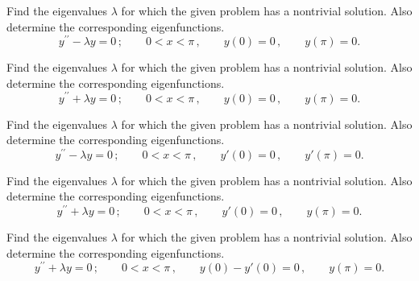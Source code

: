 \documentclass[11pt]{article}
\begin{document}
\makelabtitle





\begin{problem}
Find the eigenvalues $\lambda$ for which the given problem has a nontrivial solution. Also determine the corresponding eigenfunctions.
\begin{equation*}
y^{\prime \prime} - \lambda y =0\,; \qquad  0<x<\pi \,, \qquad y(0)=0  \,,\qquad y(\pi) =0. 
\end{equation*}
\end{problem}


\begin{problem}
Find the eigenvalues $\lambda$ for which the given problem has a nontrivial solution. Also determine the corresponding eigenfunctions.
\begin{equation*}
y^{\prime \prime} + \lambda y =0\,; \qquad  0<x<\pi \,, \qquad y(0)=0  \,,\qquad y(\pi) =0. 
\end{equation*}
\end{problem}


\begin{problem}
Find the eigenvalues $\lambda$ for which the given problem has a nontrivial solution. Also determine the corresponding eigenfunctions.
\begin{equation*}
y^{\prime \prime} - \lambda y =0\,; \qquad  0<x<\pi \,, \qquad y'(0)=0  \,,\qquad y'(\pi) =0. 
\end{equation*}
\end{problem}


\begin{problem}
 Find the eigenvalues $\lambda$ for which the given problem has a nontrivial solution. Also determine the corresponding eigenfunctions.
\begin{equation*}
y^{\prime \prime} + \lambda y =0\,; \qquad  0<x<\pi \,, \qquad y'(0)=0  \,,\qquad y(\pi) =0. 
\end{equation*}
\end{problem}


\begin{problem}
 Find the eigenvalues $\lambda$ for which the given problem has a nontrivial solution. Also determine the corresponding eigenfunctions.
\begin{equation*}
y^{\prime \prime} + \lambda y =0\,; \qquad  0<x<\pi \,, \qquad y(0) - y'(0)=0  \,,\qquad y(\pi) =0. 
\end{equation*}
\end{problem}
\end{document}
